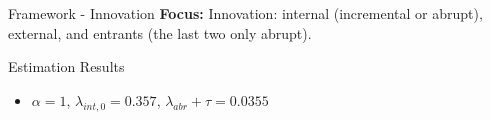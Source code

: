 \documentclass[11pt]{beamer}
\begin{document}
\begin{frame}{Framework - Innovation}
	\textbf{Focus:} Innovation: internal (incremental or abrupt), external, and entrants (the last two only abrupt).

\end{frame}

\begin{frame} {Estimation Results}
	\begin{itemize}\itemsep 12pt
		\item $\alpha = 1$, $\lambda_{int, 0}= 0.357 $, $\lambda_{abr} + \tau = 0.0355 $\\
		\begin{center}
		\begin{figure}\centering\label{Innov5}
		\end{figure}
		\end{center}
	\end{itemize}
\end{frame}
\end{document}
